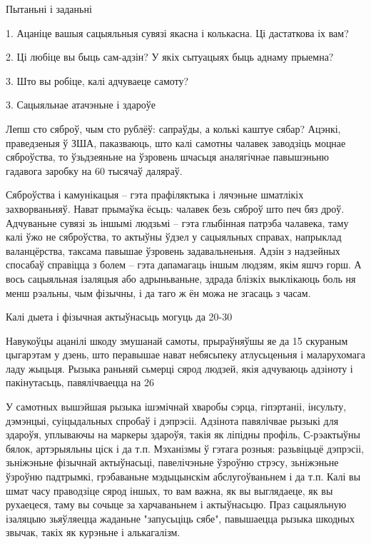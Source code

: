 Пытаньні і заданьні

1. Ацаніце вашыя сацыяльныя сувязі якасна і колькасна. Ці дастаткова іх вам?

2. Ці любіце вы быць сам-адзін? У якіх сытуацыях быць аднаму прыемна?

3. Што вы робіце, калі адчуваеце самоту?


3. Сацыяльнае атачэньне і здароўе

Лепш сто сяброў, чым сто рублёў: сапраўды, а колькі каштуе сябар? Ацэнкі, праведзеныя ў ЗША, паказваюць, што калі самотны чалавек заводзіць моцнае сяброўства, то ўзьдзеяньне на ўзровень шчасьця аналягічнае павышэньню гадавога заробку на 60 тысячаў даляраў.

Сяброўства і камунікацыя – гэта прафіляктыка і лячэньне шматлікіх захворваньняў. Нават прымаўка ёсьць: чалавек безь сяброў што печ бяз дроў. Адчуваньне сувязі зь іншымі людзьмі – гэта глыбінная патрэба чалавека, таму калі ўжо не сяброўства, то актыўны ўдзел у сацыяльных справах, напрыклад валанцёрства, таксама павышае ўзровень задавальненьня. Адзін з надзейных спосабаў справіцца з болем – гэта дапамагаць іншым людзям, якім яшчэ горш. А вось сацыяльная ізаляцыя або адрыньваньне, здрада блізкіх выклікаюць боль ня менш рэальны, чым фізычны, і да таго ж ён можа не згасаць з часам.

Калі дыета і фізычная актыўнасьць могуць да 20-30%

Навукоўцы ацанілі шкоду змушанай самоты, прыраўняўшы яе да 15 скураным цыгарэтам у дзень, што перавышае нават небясьпеку атлусьценьня і маларухомага ладу жыцьця. Рызыка раньняй сьмерці сярод людзей, якія адчуваюць адзіноту і пакінутасьць, павялічваецца на 26%

У самотных вышэйшая рызыка ішэмічнай хваробы сэрца, гіпэртаніі, інсульту, дэмэнцыі, суіцыдальных спробаў і дэпрэсіі. Адзінота павялічвае рызыкі для здароўя, уплываючы на маркеры здароўя, такія як ліпідны профіль, С-рэактыўны бялок, артэрыяльны ціск і да т.п. Мэханізмы ў гэтага розныя: разьвіцьцё дэпрэсіі, зьніжэньне фізычнай актыўнасьці, павелічэньне ўзроўню стрэсу, зьніжэньне ўзроўню падтрымкі, грэбаваньне мэдыцынскім абслугоўваньнем і да т.п. Калі вы шмат часу праводзіце сярод іншых, то вам важна, як вы выглядаеце, як вы рухаецеся, таму вы сочыце за харчаваньнем і актыўнасьцю. Праз сацыяльную ізаляцыю зьяўляецца жаданьне "запусьціць сябе", павышаецца рызыка шкодных звычак, такіх як курэньне і алькагалізм.

